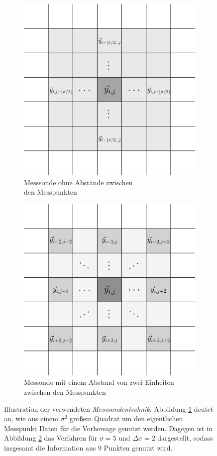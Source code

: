 \begin{figure}[h]
\centering
\begin{subfigure}{.5\textwidth}
  \centering
  \includegraphics[width=.8\linewidth]{figures/illustrations/sigma_patches.pdf}
  \caption{Messsonde ohne Abstände zwischen\\den Messpunkten}
  \label{fig:probe_illustration_no_gaps}
\end{subfigure}%
\begin{subfigure}{.5\textwidth}
  \centering
  \includegraphics[width=.8\linewidth]{figures/illustrations/sigma_patches_gaps.pdf}
  \caption{Messonde mit einem Abstand von zwei Einheiten zwischen den Messpunkten}
  \label{fig:probe_illustration_gaps}
\end{subfigure}
\caption{Illustration der verwendeten \textit{Messsondentechnik}. Abbildung \ref{fig:probe_illustration_no_gaps} deutet an, wie aus einem $\sigma^2$ großem Quadrat um den eigentlichen Messpunkt Daten für die Vorhersage genutzt werden. Dagegen ist in Abbildung \ref{fig:probe_illustration_gaps} das Verfahren für $\sigma=5$ und $\Delta \sigma = 2$ dargestellt, sodass insgesamt die Information aus $9$ Punkten genutzt wird.}
\label{fig:probe_illustration}
\end{figure}

